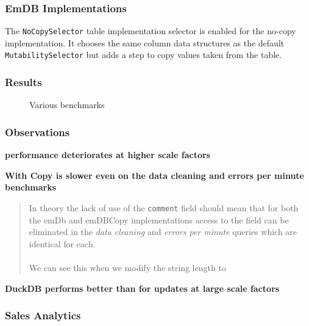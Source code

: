 \subsubsection{EmDB Implementations}
The \texttt{NoCopySelector} table implementation selector is enabled for the no-copy \emdb
implementation. It chooses the same column data structures as the default \texttt{MutabilitySelector}
but adds a step to copy values taken from the table.

\subsubsection{Results}
\begin{figure}[h!]
    \centering
    \vspace{-0.4em}
    \resizebox{\textwidth}{!}{}
    \caption{Various benchmarks}
    \label{fig:data_log_benchmark_results}
\end{figure}

\subsubsection{Observations}
\textbf{\emdb performance deteriorates at higher scale factors}
\begin{quote}

\end{quote}
\noindent
\textbf{\emdb With Copy is slower even on the data cleaning and errors per minute benchmarks}
\begin{quote}
    In theory the lack of use of the \texttt{comment} field should mean that for both the emDb and emDBCopy 
    implementations access to the field can be eliminated in the \textit{data cleaning} and \textit{errors per minute} queries which are identical for each.
    \\
    \\ We can see this when we modify the string length to 
\end{quote}
\noindent
\textbf{DuckDB performs better than \emdb for updates at large scale factors}
\begin{quote}

\end{quote}
\noindent
\subsubsection{Sales Analytics}

